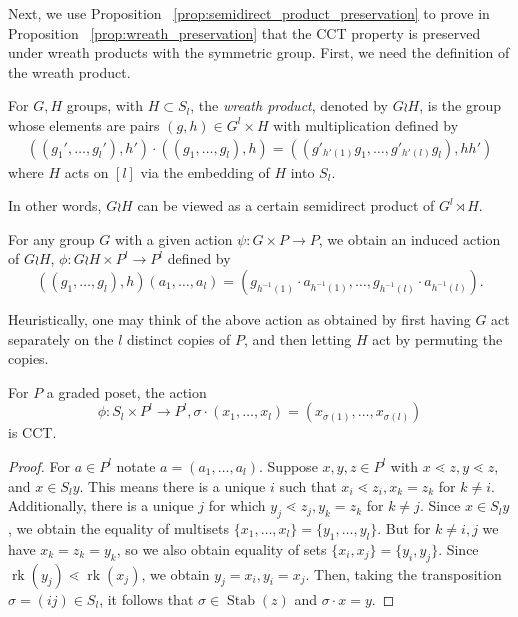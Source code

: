 \documentclass[smallextended, envcountsame, numbook]{svjour3}
\numberwithin{equation}{section}
\newcommand\rk{\operatorname{rk}}
\newcommand\Stab{\operatorname{Stab}}
\begin{document}
Next, we use Proposition ~\ref{prop:semidirect_product_preservation} to prove in Proposition ~\ref{prop:wreath_preservation} that the CCT property is preserved under wreath products with the symmetric group. First, we need the definition of the wreath product.

\begin{definition}
For $G, H$ groups, with $H \subset S_l$, the {\it wreath product}, denoted by $G \wr H$, is the group whose elements are pairs $(g,h) \in G^l\times H$ with multiplication defined by
\begin{align*}
((g_1',\ldots, g_l'),h') \cdot ((g_1,\ldots, g_l) ,h) =((g'_{h'(1)}g_1,\ldots, g'_{h'(l)}g_l),hh')
\end{align*}
where $H$ acts on $[l]$ via the embedding of $H$ into $S_l$.
\end{definition}

In other words, $G\wr H$ can be viewed as a certain semidirect product of $G^l \rtimes H$.

\begin{definition}
\label{defn:wreath_action}
For any group $G$ with a given action $\psi\colon G\times P \rightarrow P$, we obtain an induced action of $G \wr H$, $\phi\colon G \wr H \times P^l \rightarrow P^l$ defined by 
$$((g_1,\ldots, g_l),h)(a_1,\ldots, a_l) = (g_{h^{-1}(1)}\cdot a_{h^{-1}(1)},\ldots,g_{h^{-1}(l)} \cdot a_{h^{-1}(l)}).$$
\end{definition}

\begin{remark}
Heuristically, one may think of the above action as obtained by first having $G$ act separately on the $l$ distinct copies of $P$, and then letting $H$ act by permuting the copies.
\end{remark}

\begin{lemma}
\label{lem:symmetric_group_product_action}
For $P$ a graded poset, the action 
$$\phi\colon S_l \times P^l \rightarrow P^l,\sigma \cdot(x_1,\ldots, x_l) = (x_{\sigma(1)},\ldots, x_{\sigma(l)})$$
is CCT.
\end{lemma}

\begin{proof}
For $a \in P^l$ notate $a = (a_1,\ldots, a_l)$. Suppose $x,y,z \in P^l$ with $x\lessdot z,y\lessdot z$, and $x \in S_ly$. This means there is a unique $i$ such that $x_i \lessdot z_i,x_k = z_k$ for $k \neq i$. Additionally, there is a unique $j$ for which $y_j \lessdot z_j,y_k =z_k$ for $k \neq j$. Since $x \in S_ly$, we obtain the equality of multisets $\{x_1,\ldots, x_l\}=\{y_1,\ldots,y_l\}$. But for $k \neq i,j$ we have $x_k = z_k = y_k$, so we also obtain equality of sets $\{x_i,x_j\} = \{y_i,y_j\}$. Since $\rk(y_j) \lessdot \rk(x_j)$, we obtain $y_j = x_i,y_i = x_j$. Then, taking the transposition $\sigma  = (ij) \in S_l$, it follows that $\sigma \in \Stab(z)$ and $\sigma \cdot x = y$.
\end{proof}
\end{document}
